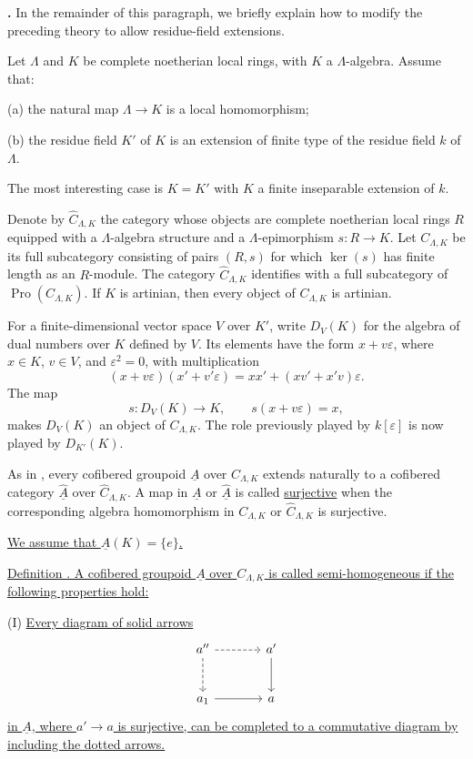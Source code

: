 
\textbf{.} In the remainder of this paragraph, we briefly explain
how to modify the preceding theory to allow residue-field extensions.

Let $\Lambda$ and $K$ be complete noetherian local rings, with $K$ a
$\Lambda$-algebra. Assume that:

(a) the natural map $\Lambda\longrightarrow K$ is a local
homomorphism;

(b) the residue field $K'$ of $K$ is an extension of finite type of
the residue field $k$ of $\Lambda$.

The most interesting case is $K=K'$ with $K$ a finite inseparable
extension of $k$.

Denote by $\widehat C_{\Lambda,K}$ the category whose objects are
complete noetherian local rings $R$ equipped with a
$\Lambda$-algebra structure and a $\Lambda$-epimorphism
$s:R\longrightarrow K$. Let $C_{\Lambda,K}$ be its full subcategory
consisting of pairs $(R,s)$ for which $\ker(s)$ has finite length as
an $R$-module. The category $\widehat C_{\Lambda,K}$ identifies with
a full subcategory of $\operatorname{Pro}(C_{\Lambda,K})$. If $K$ is
artinian, then every object of $C_{\Lambda,K}$ is artinian.

For a finite-dimensional vector space $V$ over $K'$, write $D_V(K)$
for the algebra of dual numbers over $K$ defined by $V$. Its elements
have the form $x+v\varepsilon$, where $x\in K$, $v\in V$, and
$\varepsilon^2=0$, with multiplication
\[
 (x+v\varepsilon)(x'+v'\varepsilon)
 =xx'+(xv'+x'v)\varepsilon.
\]
The map
\[
 s:D_V(K)\longrightarrow K,
 \qquad s(x+v\varepsilon)=x,
\]
makes $D_V(K)$ an object of $C_{\Lambda,K}$. The role previously
played by $k[\varepsilon]$ is now played by $D_{K'}(K)$.

As in , every cofibered groupoid $\underline A$ over
$C_{\Lambda,K}$ extends naturally to a cofibered category
$\widehat{\underline A}$ over $\widehat C_{\Lambda,K}$. A map in
$\underline A$ or $\widehat{\underline A}$ is called
\underline{surjective} when the corresponding algebra homomorphism
in $C_{\Lambda,K}$ or $\widehat C_{\Lambda,K}$ is surjective.


\underline{We assume that $\underline A(K)=\{e\}$.}

\underline{Definition . A cofibered groupoid $\underline A$ over
$C_{\Lambda,K}$ is called semi-homogeneous if the following
properties hold:}

(I) \underline{Every diagram of solid arrows}
\[
\begin{tikzcd}[row sep=large,column sep=large]
a'' \arrow[r,dashed] \arrow[d,dashed]
 & a' \arrow[d] \\
a_1 \arrow[r] & a
\end{tikzcd}
\]
\underline{in $\underline A$, where $a'\longrightarrow a$ is
surjective, can be completed to a commutative diagram by including the
dotted arrows.}

